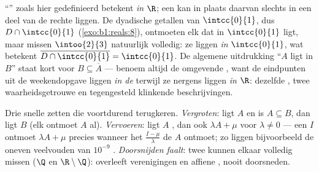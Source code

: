 \begin{example}\label{ex:b1:topology:relativedensity}
``'' zoals hier gedefinieerd betekent  \emph{in $\R$}; een
 kan in plaats daarvan slechts in een deel van de rechte 
liggen. De dyadische getallen van $\intcc{0}{1}$, dus $D \cap
\intcc{0}{1}$ (\cref{exo:b1:reals:8}), ontmoeten elk   dat in
$\intcc{0}{1}$ ligt, maar missen $\intoo{2}{3}$ natuurlijk volledig: ze
liggen  \emph{in} $\intcc{0}{1}$, wat betekent $\overline{D \cap
\intcc{0}{1}} = \intcc{0}{1}$. De algemene uitdrukking ``$A$ ligt 
in $B$'' staat kort voor $B \subseteq \overline A$ --- benoem altijd de
omgevende , want de eindpunten uit de weekendopgave liggen
 \emph{in de } terwijl ze nergens  liggen
\emph{in $\R$}: dezelfde , twee waarheidsgetrouwe en
tegengesteld klinkende beschrijvingen.
\end{example}

\begin{example}\label{ex:b1:topology:densitytricks}
Drie snelle zetten die voortdurend terugkeren. \emph{Vergroten}: ligt $A$
 en is $A \subseteq B$, dan ligt $B$  (elk  ontmoet $A$
al). \emph{Vervoeren}: ligt $A$ , dan ook $\lambda A + \mu$ voor
$\lambda \neq 0$ --- een  $I$ ontmoet $\lambda A + \mu$ precies
wanneer het  $\frac{I - \mu}{\lambda}$ de  $A$
ontmoet; zo liggen bijvoorbeeld de oneven veelvouden van $10^{-9}$ .
\emph{Doorsnijden faalt}: twee   kunnen elkaar
volledig missen ($\Q$ en $\R \setminus \Q$):  overleeft
verenigingen en affiene , nooit doorsneden.
\end{example}

